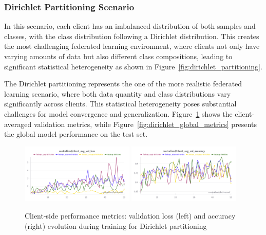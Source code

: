 \documentclass[11pt]{article}
\begin{document}
    \subsubsection{Dirichlet Partitioning Scenario}
    \label{subsubsec:dirichlet-scenario}

    In this scenario, each client has an imbalanced distribution of both samples and classes, with the class distribution following a Dirichlet distribution. This creates the most challenging federated learning environment, where clients not only have varying amounts of data but also different class compositions, leading to significant statistical heterogeneity as shown in Figure~\ref{fig:dirichlet_partitioning}.


    The Dirichlet partitioning represents the one of the more realistic federated learning scenario, where both data quantity and class distributions vary significantly across clients. This statistical heterogeneity poses substantial challenges for model convergence and generalization. Figure~\ref{fig:dirichlet_client_metrics} shows the client-averaged validation metrics, while Figure~\ref{fig:dirichlet_global_metrics} presents the global model performance on the test set.

    \begin{figure}[h]
        \centering
        \includegraphics[width=0.48\textwidth]{img/experiment_1/dirichlet_client_avg_val_loss}
        \hfill
        \includegraphics[width=0.48\textwidth]{img/experiment_1/dirichlet_client_avg_val_acc}
        \caption{Client-side performance metrics: validation loss (left) and accuracy (right) evolution during training for Dirichlet partitioning}
        \label{fig:dirichlet_client_metrics}
    \end{figure}
\end{document}
